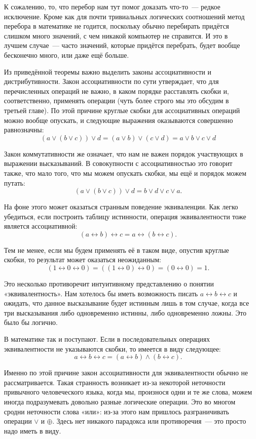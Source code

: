 К сожалению, то, что перебор нам тут помог доказать что-то~— редкое исключение. Кроме как для почти тривиальных логических соотношений метод перебора в математике не годится, поскольку обычно перебирать придётся слишком много значений, с чем никакой компьютер не справится. И это в лучшем случае~— часто значений, которые придётся перебрать, будет вооб\-ще беско\-неч\-но много, или даже ещё больше.

Из приведённой теоремы важно выделить законы ассоциативности и дистрибутивности. Закон ассоциативности по сути утверждает, что для перечисленных операций не важно, в каком порядке расставлять скобки и, соответственно, применять операции (чуть более строго мы это обсудим в третьей главе). По этой причине круглые скобки для ассоциативных операций можно вооб\-ще опускать, и следующие выражения оказываются совершенно равнозначны:
$$
(a \lor (b \lor c)) \lor d = (a \lor b) \lor (c \lor d) = a \lor b \lor c \lor d
$$

Закон коммутативности же означает, что нам не важен порядок участвующих в выражении высказываний. В совокупности с ассоциативностью это говорит также, что мало того, что мы можем опускать скобки, мы ещё и порядок можем путать:
$$
(a \lor (b \lor c)) \lor d = b \lor d \lor c \lor a.
$$

На фоне этого может оказаться странным поведение эквиваленции. Как легко убедиться, если построить таблицу истинности, операция эквивалентности тоже является ассоциативной:
$$
(a \leftrightarrow b) \leftrightarrow c = a \leftrightarrow (b \leftrightarrow c).
$$

Тем не менее, если мы будем применять её в таком виде, опустив круглые скобки, то результат может оказаться неожиданным:
$$
(1 \leftrightarrow 0 \leftrightarrow 0) = ((1 \leftrightarrow 0) \leftrightarrow 0) = (0 \leftrightarrow 0) = 1.
$$

Это несколько противоречит интуитивному представлению о понятии «эквивалентность». Нам хотелось бы иметь возможность писать $a \leftrightarrow b \leftrightarrow c$ и ожидать, что данное высказывание будет истинным лишь в том случае, когда все три высказывания либо одновременно истинны, либо одновременно ложны. Это было бы логично.

В математике так и поступают. Если в последовательных операциях эквивалентности не указываются скобки, то имеется в виду следующее:
$$
a \leftrightarrow b \leftrightarrow c = (a \leftrightarrow b) \land (b \leftrightarrow c).
$$

Именно по этой причине закон ассоциативности для эквивалентности обычно не рассматривается. Такая странность возникает из-за некоторой неточности привычного человеческого языка, когда мы, произнося одни и те же слова, можем иногда подразумевать довольно разные логические операции. Это во многом сродни неточности слова «или»: из-за этого нам пришлось разграничивать операции $\lor$ и $\oplus$. Здесь нет никакого парадокса или противоречия~— это просто надо иметь в виду.


